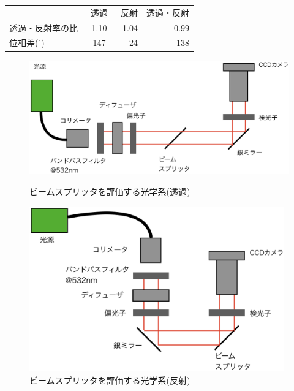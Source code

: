 \documentclass[11pt,a4paper]{jsarticle}
\begin{document}
\begin{table}[htb]
  \begin{tabular}{lcrr}
     & 透過　& 反射  & 透過・反射 \\
    透過・反射率の比 & 1.10 & 1.04 & 0.99\\
    位相差($^\circ$) & 147 & 24 &138
    \label{tab:BS}
  \end{tabular}
\end{table}

\begin{figure}[htb]
     \begin{minipage}{\hsize}
  \begin{center}
   \includegraphics[width=120mm]{schematics_BS_T2.eps}
  \end{center}
  \caption{ビームスプリッタを評価する光学系(透過)}
  \label{fig:schematics_BS_T2}
   \end{minipage}
  \begin{minipage}{\hsize}
  \begin{center}
   \includegraphics[width=110mm]{schematics_BS_R.eps}
  \end{center}
  \caption{ビームスプリッタを評価する光学系(反射)}
  \label{fig:schematics_BS_R}
   \end{minipage}
     \begin{minipage}{\hsize}
  \begin{center}

\end{center}
\end{minipage}
\end{figure}
\end{document}
